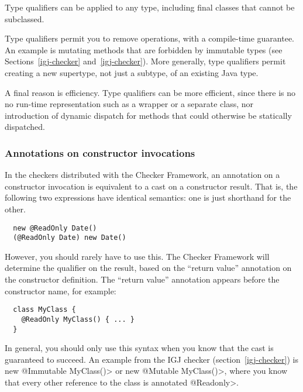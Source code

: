 Type qualifiers can be applied to any type, including final classes that
cannot be subclassed.

Type qualifiers permit you to remove operations, with a compile-time
guarantee.  An example is mutating methods that are forbidden by immutable
types (see Sections~\ref{igj-checker} and~\ref{igj-checker}).  More
generally, type qualifiers permit creating a new supertype, not just a
subtype, of an existing Java type.

A final reason is efficiency.  Type qualifiers can be more
efficient, since there is no no run-time representation such as a wrapper
or a separate class, nor introduction of dynamic dispatch for methods that
could otherwise be statically dispatched.


\subsubsection{Annotations on constructor invocations\label{annotations-on-constructor-invocations}}


In the checkers distributed with the Checker Framework, an annotation on a
constructor invocation is equivalent to a cast on a constructor result.
That is, the following two expressions have identical semantics:  one is
just shorthand for the other.

\begin{Verbatim}
  new @ReadOnly Date()
  (@ReadOnly Date) new Date()
\end{Verbatim}

However, you should rarely have to use this.  The Checker Framework will
determine the qualifier on the result, based on the ``return value''
annotation on the constructor definition.  The ``return value'' annotation
appears before the constructor name, for example:

\begin{Verbatim}
  class MyClass {
    @ReadOnly MyClass() { ... }
  }
\end{Verbatim}

In general, you should only use this syntax when you know that the cast is
guaranteed to succeed.  An example from the IGJ checker
(section~\ref{igj-checker}) is \<new @Immutable MyClass()> or \<new
@Mutable MyClass()>, where you know that every other reference to the class
is annotated \<@Readonly>.



